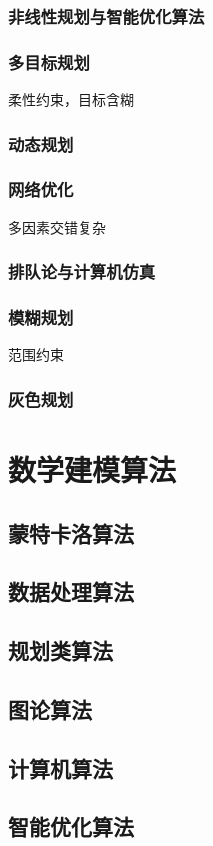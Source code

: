 \documentclass[openany]{progbookcn}
\begin{document}
\section{非线性规划与智能优化算法}
\section{多目标规划}
柔性约束，目标含糊
\section{动态规划}

\section{网络优化}
多因素交错复杂
\section{排队论与计算机仿真}
\section{模糊规划}
范围约束
\section{灰色规划}
\part{数学建模算法}
\chapter{蒙特卡洛算法}
\chapter{数据处理算法}
\chapter{规划类算法}
\chapter{图论算法}
\chapter{计算机算法}
\chapter{智能优化算法}
\end{document}

